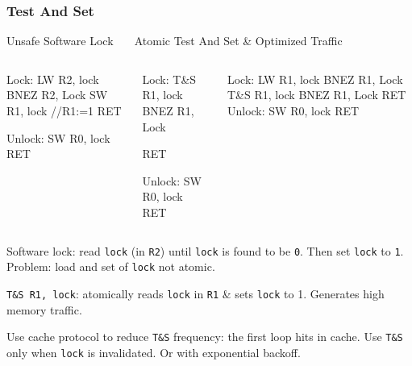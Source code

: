 \documentclass{beamer}
\renewcommand{\emph}[1]{\textcolor{structure}{#1}}
\newcommand{\emp}[1]{\textcolor{DikuRed}{ #1}}
\begin{document}
\begin{frame}[fragile,t]
\frametitle{Test And Set}

\begin{block}{Unsafe Software Lock{\tt~~~} Atomic Test And Set \& Optimized Traffic}
\begin{columns}
\begin{colorcode}[fontsize=\scriptsize]
Lock:   \alert{LW   R2, lock}
        BNEZ R2, Lock
        \alert{SW   R1, lock} //R1:=1
        RET

Unlock: SW   R0, lock
        RET
\end{colorcode} 
\begin{colorcode}[fontsize=\scriptsize]
Lock:   \emp{T\&S R1, lock}
        BNEZ R1, Lock

        RET

Unlock: SW   R0, lock
        RET
\end{colorcode} 
\begin{colorcode}[fontsize=\scriptsize]
Lock:   \emph{LW   R1, lock}
        \emph{BNEZ R1, Lock}
        \emph{T\&S R1, lock}
        BNEZ R1, Lock
        RET
Unlock: SW   R0, lock
        RET
\end{colorcode}   
\end{columns}
\end{block}

\alert{Software lock}: read {\tt lock} (in {\tt R2}) until {\tt lock} is found to be {\tt 0}.
    Then set {\tt lock} to {\tt 1}. \alert{Problem: load and set of {\tt lock} not atomic.}\medskip

\emp{\tt T\&S R1, lock}: atomically reads {\tt lock} in {\tt R1} \& sets {\tt lock} to 1. 
\emp{Generates high memory traffic.}\medskip

\emph{Use cache protocol to reduce {\tt T\&S} frequency:} the first loop hits in cache.
Use {\tt T\&S} only when {\tt lock} is invalidated. Or with exponential backoff.

\end{frame}
\end{document}
